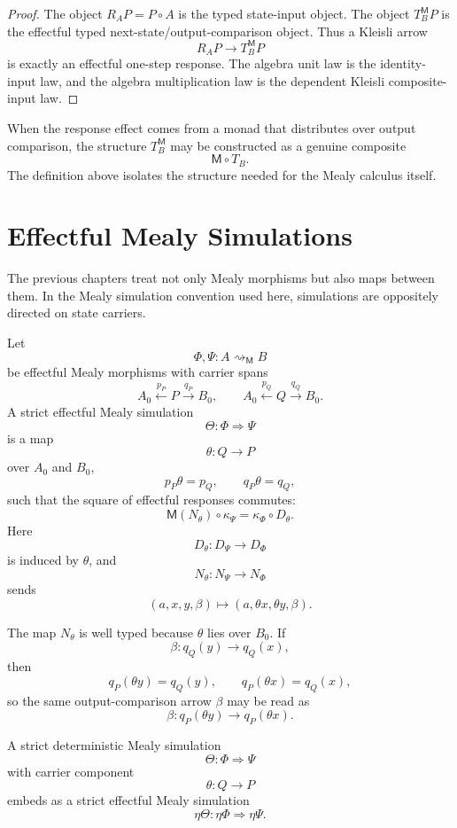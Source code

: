 \begin{proof}
The object \(R_A P=P\circ A\) is the typed state-input object.  The object
\(T_B^{\mathsf M}P\) is the effectful typed next-state/output-comparison object.  Thus a Kleisli
arrow
\[
R_A P\to T_B^{\mathsf M}P
\]
is exactly an effectful one-step response.  The algebra unit law is the identity-input law, and the
algebra multiplication law is the dependent Kleisli composite-input law.
\end{proof}

When the response effect comes from a monad that distributes over output comparison, the structure
\(T_B^{\mathsf M}\) may be constructed as a genuine composite
\[
\mathsf M\circ T_B .
\]
The definition above isolates the structure needed for the Mealy calculus itself.

\section{Effectful Mealy Simulations}
\label{sec:effectful-mealy-simulations}

The previous chapters treat not only Mealy morphisms but also maps between them.  In the Mealy
simulation convention used here, simulations are oppositely directed on state carriers.

\begin{definition}
\label{def:strict-effectful-mealy-simulation}
Let
\[
\Phi,\Psi:A\rightsquigarrow_{\mathsf M}B
\]
be effectful Mealy morphisms with carrier spans
\[
A_0\xleftarrow{p_P}P\xrightarrow{q_P}B_0,
\qquad
A_0\xleftarrow{p_Q}Q\xrightarrow{q_Q}B_0.
\]
A strict effectful Mealy simulation
\[
\Theta:\Phi\Rightarrow\Psi
\]
is a map
\[
\theta:Q\to P
\]
over \(A_0\) and \(B_0\),
\[
p_P\theta=p_Q,
\qquad
q_P\theta=q_Q,
\]
such that the square of effectful responses commutes:
\[
\mathsf M(N_\theta)\circ \kappa_\Psi
=
\kappa_\Phi\circ D_\theta .
\]
Here
\[
D_\theta:D_\Psi\to D_\Phi
\]
is induced by \(\theta\), and
\[
N_\theta:N_\Psi\to N_\Phi
\]
sends
\[
(a,x,y,\beta)
\longmapsto
(a,\theta x,\theta y,\beta).
\]
\end{definition}

The map \(N_\theta\) is well typed because \(\theta\) lies over \(B_0\).  If
\[
\beta:q_Q(y)\to q_Q(x),
\]
then
\[
q_P(\theta y)=q_Q(y),
\qquad
q_P(\theta x)=q_Q(x),
\]
so the same output-comparison arrow \(\beta\) may be read as
\[
\beta:q_P(\theta y)\to q_P(\theta x).
\]

\begin{proposition}
\label{prop:deterministic-simulations-embed}
A strict deterministic Mealy simulation
\[
\Theta:\Phi\Rightarrow\Psi
\]
with carrier component
\[
\theta:Q\to P
\]
embeds as a strict effectful Mealy simulation
\[
\eta\Theta:\eta\Phi\Rightarrow\eta\Psi .
\]
\end{proposition}

